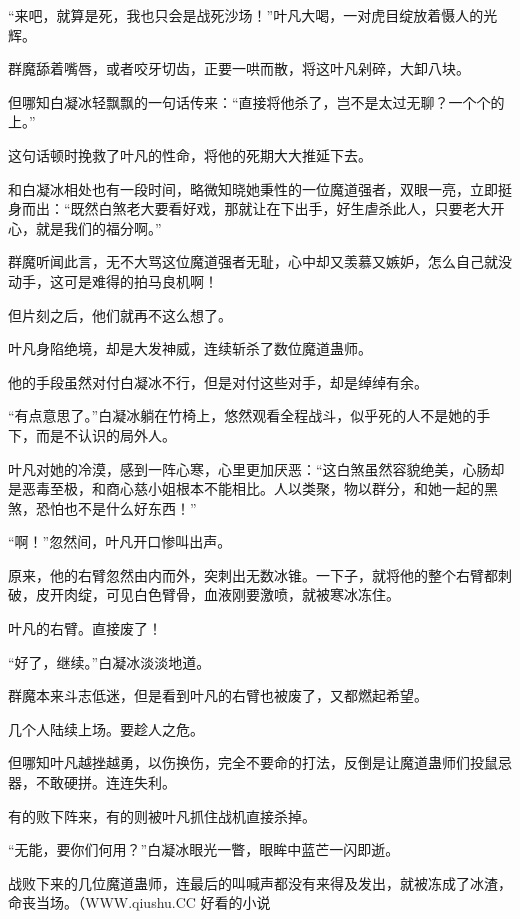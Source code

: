 
\begin{this_body}

“来吧，就算是死，我也只会是战死沙场！”叶凡大喝，一对虎目绽放着慑人的光辉。

群魔舔着嘴唇，或者咬牙切齿，正要一哄而散，将这叶凡剁碎，大卸八块。

但哪知白凝冰轻飘飘的一句话传来：“直接将他杀了，岂不是太过无聊？一个个的上。”

这句话顿时挽救了叶凡的性命，将他的死期大大推延下去。

和白凝冰相处也有一段时间，略微知晓她秉性的一位魔道强者，双眼一亮，立即挺身而出：“既然白煞老大要看好戏，那就让在下出手，好生虐杀此人，只要老大开心，就是我们的福分啊。”

群魔听闻此言，无不大骂这位魔道强者无耻，心中却又羡慕又嫉妒，怎么自己就没动手，这可是难得的拍马良机啊！

但片刻之后，他们就再不这么想了。

叶凡身陷绝境，却是大发神威，连续斩杀了数位魔道蛊师。

他的手段虽然对付白凝冰不行，但是对付这些对手，却是绰绰有余。

“有点意思了。”白凝冰躺在竹椅上，悠然观看全程战斗，似乎死的人不是她的手下，而是不认识的局外人。

叶凡对她的冷漠，感到一阵心寒，心里更加厌恶：“这白煞虽然容貌绝美，心肠却是恶毒至极，和商心慈小姐根本不能相比。人以类聚，物以群分，和她一起的黑煞，恐怕也不是什么好东西！”

“啊！”忽然间，叶凡开口惨叫出声。

原来，他的右臂忽然由内而外，突刺出无数冰锥。一下子，就将他的整个右臂都刺破，皮开肉绽，可见白色臂骨，血液刚要激喷，就被寒冰冻住。

叶凡的右臂。直接废了！

“好了，继续。”白凝冰淡淡地道。

群魔本来斗志低迷，但是看到叶凡的右臂也被废了，又都燃起希望。

几个人陆续上场。要趁人之危。

但哪知叶凡越挫越勇，以伤换伤，完全不要命的打法，反倒是让魔道蛊师们投鼠忌器，不敢硬拼。连连失利。

有的败下阵来，有的则被叶凡抓住战机直接杀掉。

“无能，要你们何用？”白凝冰眼光一瞥，眼眸中蓝芒一闪即逝。

战败下来的几位魔道蛊师，连最后的叫喊声都没有来得及发出，就被冻成了冰渣，命丧当场。（WWW.qiushu.CC 好看的小说


\end{this_body}
